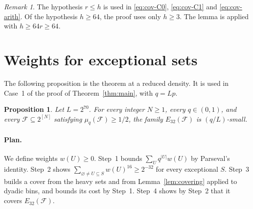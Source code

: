 \documentclass[11pt,letterpaper]{article}
\newtheorem{proposition}[theorem]{Proposition}
\theoremstyle{definition}
\theoremstyle{remark}
\newtheorem{remark}[theorem]{Remark}
\numberwithin{equation}{section}
\begin{document}
\begin{remark}
The hypothesis $r\le h$ is used in \eqref{eq:cov-C0}, \eqref{eq:cov-C1} and
\eqref{eq:cov-arith}. Of the hypothesis $h\ge64$, the proof uses only $h\ge3$.
The lemma is applied with $h\ge64r\ge64$.
\end{remark}

\section{Weights for exceptional sets}
\label{sec:weights}

The following proposition is the theorem at a reduced density. It is used in
Case~1 of the proof of Theorem~\ref{thm:main}, with $q=Lp$.

\begin{proposition}\label{prop:half-density}
Let $L=2^{70}$. For every integer $N\ge1$, every $q\in(0,1)$, and every
$\mathcal F\subseteq 2^{[N]}$ satisfying $\mu_q(\mathcal F)\ge1/2$,
the family $E_{32}(\mathcal F)$ is $(q/L)$-small.
\end{proposition}

\paragraph{Plan.}
We define weights $w(U)\ge0$. Step~1 bounds $\sum_Uq^{|U|}w(U)$ by Parseval's
identity. Step~2 shows $\sum_{\varnothing\ne U\subseteq S}w(U)^{16}\ge2^{-32}$
for every exceptional $S$. Step~3 builds a cover from the heavy sets and from
Lemma~\ref{lem:covering} applied to dyadic bins, and bounds its cost by
Step~1. Step~4 shows by Step~2 that it covers $E_{32}(\mathcal F)$.
\end{document}
